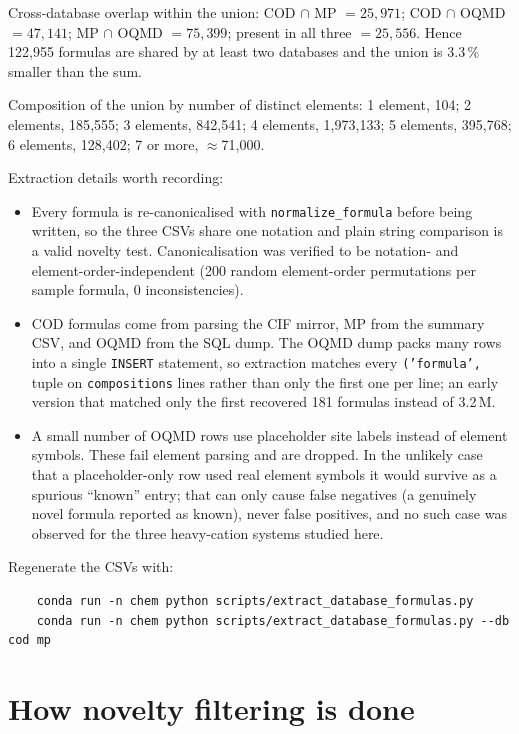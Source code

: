 \documentclass[11pt,a4paper]{article}
\newcommand{\code}[1]{\texttt{#1}}
\begin{document}
Cross-database overlap within the union: COD $\cap$ MP $= 25{,}971$; COD $\cap$ OQMD $= 47{,}141$;
MP $\cap$ OQMD $= 75{,}399$; present in all three $= 25{,}556$. Hence 122{,}955 formulas are
shared by at least two databases and the union is $3.3\,\%$ smaller than the sum.

Composition of the union by number of distinct elements: 1 element, 104; 2 elements, 185{,}555;
3 elements, 842{,}541; 4 elements, 1{,}973{,}133; 5 elements, 395{,}768; 6 elements, 128{,}402;
7 or more, $\approx$71{,}000.

Extraction details worth recording:
\begin{itemize}
  \item Every formula is re-canonicalised with \code{normalize\_formula} before being written, so
        the three CSVs share one notation and plain string comparison is a valid novelty test.
        Canonicalisation was verified to be notation- and element-order-independent (200 random
        element-order permutations per sample formula, 0 inconsistencies).
  \item COD formulas come from parsing the CIF mirror, MP from the summary CSV, and OQMD from the
        SQL dump. The OQMD dump packs many rows into a single \code{INSERT} statement, so
        extraction matches every \code{('formula',} tuple on \code{compositions} lines rather than
        only the first one per line; an early version that matched only the first recovered 181
        formulas instead of 3.2\,M.
  \item A small number of OQMD rows use placeholder site labels instead of element symbols. These
        fail element parsing and are dropped. In the unlikely case that a placeholder-only row used
        real element symbols it would survive as a spurious ``known'' entry; that can only cause
        false negatives (a genuinely novel formula reported as known), never false positives, and
        no such case was observed for the three heavy-cation systems studied here.
\end{itemize}

\noindent Regenerate the CSVs with:
\begin{verbatim}
    conda run -n chem python scripts/extract_database_formulas.py
    conda run -n chem python scripts/extract_database_formulas.py --db cod mp
\end{verbatim}

\section{How novelty filtering is done}
\end{document}
